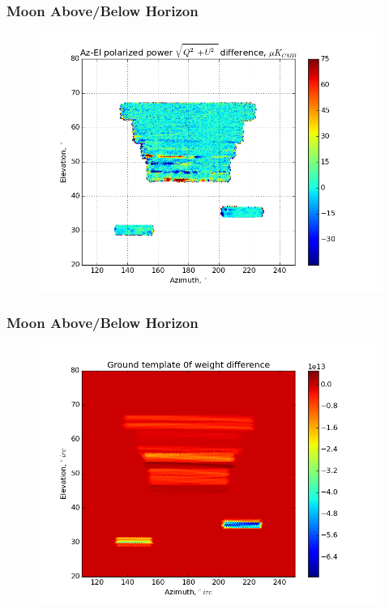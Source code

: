 \documentclass{beamer}
\begin{document}
\begin{frame}
\frametitle{Moon Above/Below Horizon}
\begin{figure}
\includegraphics[width=0.9\linewidth]{dMag_gt_MOON_HORIZON.png}
\end{figure}
\end{frame}

\begin{frame}
\frametitle{Moon Above/Below Horizon}
\begin{figure}
\includegraphics[width=0.9\linewidth]{dw0_gt_MOON_HORIZON.png}
\end{figure}
\end{frame}
\end{document}
